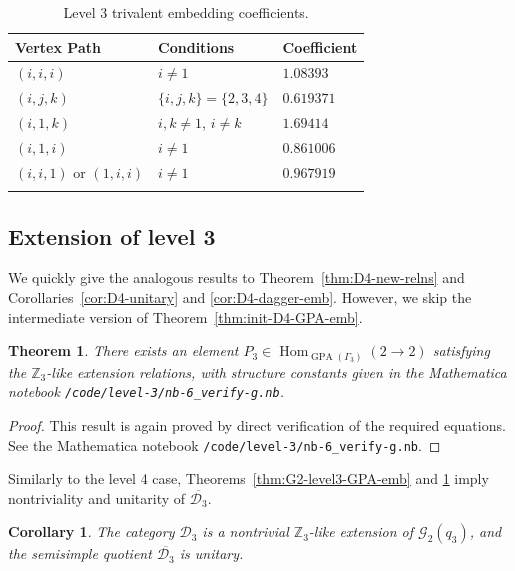\documentclass[pdflatex,sn-mathphys-num]{sn-jnl}%
\theoremstyle{thmstyleone}%
\newtheorem{theorem}{Theorem}
\newtheorem{corollary}{Corollary}
\theoremstyle{thmstyletwo}%
\theoremstyle{thmstylethree}%
\newcommand{\Z}{\mathbb{Z}}
\newcommand{\DD}{\mathcal{D}}
\newcommand{\GG}{\mathcal{G}}
\newcommand{\ol}{\overline}
\DeclareMathOperator{\Hom}{Hom}
\DeclareMathOperator{\GPA}{GPA}
\begin{document}
\begin{table}
    \caption{Level 3 trivalent embedding coefficients.}
    \label{tab:lvl-3-triv-coefs}
    \begin{tabular}{ll|l}
        \toprule
        Vertex Path & Conditions & Coefficient \\ 
        \midrule
        $(i,i,i)$ &  $i\neq1$ & $1.08393$ \\
        $(i,j,k)$ &  $\{i,j,k\}=\{2,3,4\}$   & $0.619371$ \\
        $(i,1,k)$ &  $i,k\neq 1$, $i\neq k$ & $1.69414$ \\ 
        $(i,1,i)$ &  $i\neq 1$   & $0.861006$ \\ 
        $(i,i,1)$ or $(1,i,i)$ &  $i\neq1$   & $0.967919$ \\ 
        \botrule
    \end{tabular}
\end{table}



\subsection{Extension of level 3}
We quickly give the analogous results to Theorem~\ref{thm:D4-new-relns} 
and Corollaries~\ref{cor:D4-unitary} and \ref{cor:D4-dagger-emb}.
However, we skip the intermediate version of Theorem~\ref{thm:init-D4-GPA-emb}.

\begin{theorem}\label{thm:D3-GPA-emb}
    There exists an element $P_3 \in\Hom_{\GPA(\Gamma_3)}(2\to 2)$ satisfying the $\Z_3$-like extension relations, 
    with structure constants given in the Mathematica notebook \verb|/code/level-3/nb-6_verify-g.nb|.
\end{theorem}
\begin{proof}
    This result is again proved by direct verification of the required equations.
    See the Mathematica notebook \verb|/code/level-3/nb-6_verify-g.nb|.
\end{proof}

Similarly to the level 4 case, Theorems~\ref{thm:G2-level3-GPA-emb} and \ref{thm:D3-GPA-emb}
imply nontriviality and unitarity of $\ol{\DD_3}$.

\begin{corollary}\label{cor:D3-unitary}
    The category $\DD_3$ is a nontrivial $\Z_3$-like extension of $\GG_2(q_3)$, 
    and the semisimple quotient $\ol{\DD_3}$ is unitary.
\end{corollary}
\end{document}
